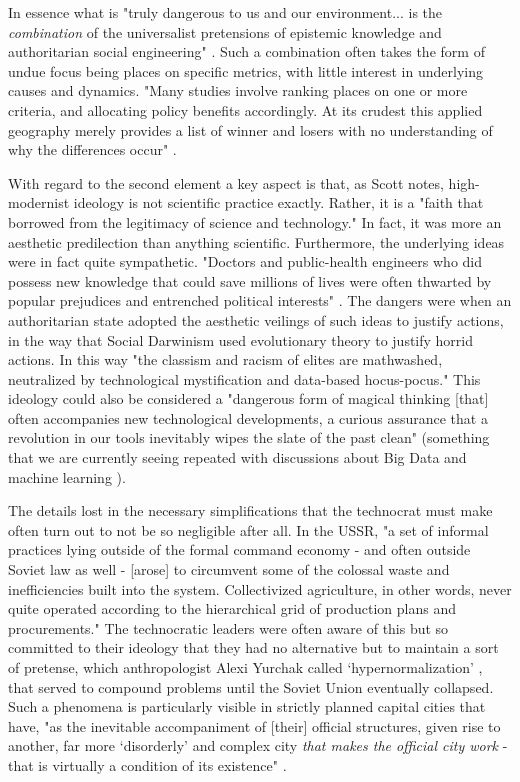 In essence what is "truly dangerous to us and our environment... is the \textit{combination} of the universalist pretensions of epistemic knowledge and authoritarian social engineering" \cite{scottSeeingStateHow2020}. Such a combination often takes the form of undue focus being places on specific metrics, with little interest in underlying causes and dynamics. "Many studies involve ranking places on one or more criteria, and allocating policy benefits accordingly. At its crudest this applied geography merely provides a list of winner and losers with no understanding of why the differences occur" \cite{taylorGeographicInformationSystems1994}.

With regard to the second element a key aspect is that, as Scott notes, high-modernist ideology is not scientific practice exactly. Rather, it is a "faith that borrowed from the legitimacy of science and technology." In fact, it was more an aesthetic predilection than anything scientific. Furthermore, the underlying ideas were in fact quite sympathetic. "Doctors and public-health engineers who did possess new knowledge that could save millions of lives were often thwarted by popular prejudices and entrenched political interests"  \cite{scottSeeingStateHow2020}. The dangers were when an authoritarian state adopted the aesthetic veilings of such ideas to justify actions, in the way that Social Darwinism used evolutionary theory to justify horrid actions. In this way "the classism and racism of elites are mathwashed, neutralized by technological mystification and data-based hocus-pocus." \cite{eubanksAutomatingInequalityHow2018} This ideology could also be considered a "dangerous form of magical thinking [that] often accompanies new technological developments, a curious assurance that a revolution in our tools inevitably wipes the slate of the past clean" \cite{eubanksAutomatingInequalityHow2018} (something that we are currently seeing repeated with discussions about Big Data and machine learning \cite{barnesBigDataSocial2014}).

The details lost in the necessary simplifications that the technocrat must make often turn out to not be so negligible after all. In the USSR, "a set of informal practices lying outside of the formal command economy - and often outside Soviet law as well - [arose] to circumvent some of the colossal waste and inefficiencies built into the system. Collectivized agriculture, in other words, never quite operated according to the hierarchical grid of production plans and procurements." \cite{scottSeeingStateHow2020} The technocratic leaders were often aware of this but so committed to their ideology that they had no alternative but to maintain a sort of pretense, which anthropologist Alexi Yurchak called `hypernormalization' \cite{yurchakEverythingWasForever2005}, that served to compound problems until the Soviet Union eventually collapsed. Such a phenomena is particularly visible in strictly planned capital cities that have, "as the inevitable accompaniment of [their] official structures, given rise to another, far more `disorderly' and complex city \textit{that makes the official city work} - that is virtually a condition of its existence" \cite{scottSeeingStateHow2020}.

